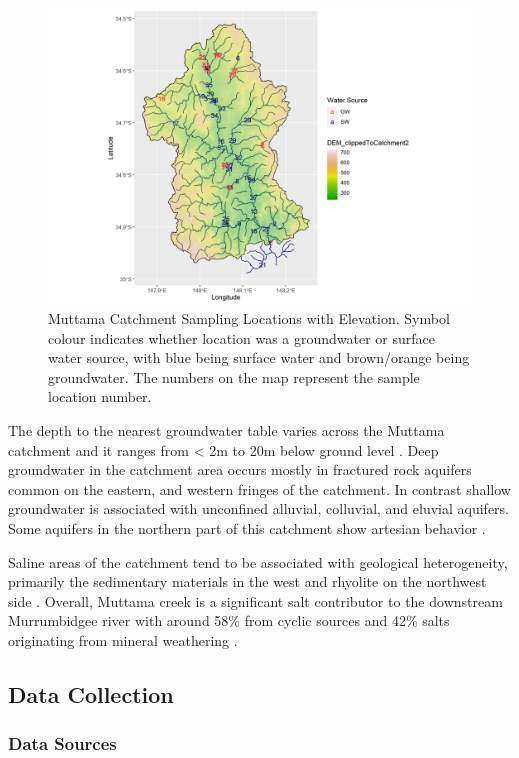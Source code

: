 \documentclass[, manuscript]{copernicus}
\begin{document}
\clearpage
\begin{figure}
\includegraphics[width=0.8\linewidth]{Figures/gw_or_sw_map} \caption{Muttama Catchment Sampling Locations with Elevation. Symbol colour indicates whether location was a groundwater or surface water source, with blue being surface water and brown/orange being groundwater. The numbers on the map represent the sample location number.}\label{fig:samplemap}
\end{figure}

The depth to the nearest groundwater table varies across the Muttama
catchment and it ranges from \textless{} 2m to 20m below ground level
\citep{DECC2009}. Deep groundwater in the catchment area occurs mostly
in fractured rock aquifers common on the eastern, and western fringes of
the catchment. In contrast shallow groundwater is associated with
unconfined alluvial, colluvial, and eluvial aquifers. Some aquifers in
the northern part of this catchment show artesian behavior
\citep{Webb1999, Akter2018}.

Saline areas of the catchment tend to be associated with geological
heterogeneity, primarily the sedimentary materials in the west and
rhyolite on the northwest side \citep{Conyers2008}. Overall, Muttama
creek is a significant salt contributor to the downstream Murrumbidgee
river with around 58\% from cyclic sources and 42\% salts originating
from mineral weathering \citep{Conyers2008}.

\subsection{Data Collection}

\subsubsection{Data Sources}
\end{document}
